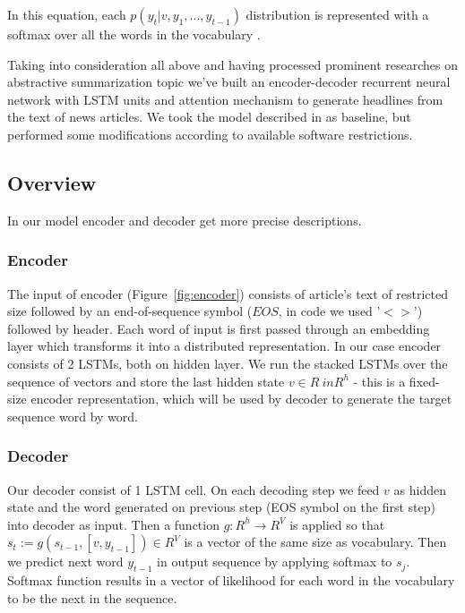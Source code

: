In this equation, each $p(y_t|v, y_1, ..., y_{t-1})$ distribution is represented with a softmax over all the
words in the vocabulary \cite{seq2seq_with_NN}.

Taking into consideration all above and having processed prominent researches on abstractive summarization topic we've built an encoder-decoder recurrent neural network with LSTM units and attention mechanism to generate headlines from the text of news articles. We took the model described in \cite{basic-article} as baseline, but performed some modifications according to available software restrictions.

\subsection{Overview}
In our model encoder and decoder get more precise descriptions. 

\subsubsection{Encoder}
The input of encoder (Figure~\ref{fig:encoder}) consists of article's text of restricted size followed by an end-of-sequence symbol ($EOS$, in code we used '$<>$') followed by header. Each word of input is first passed through an embedding layer which transforms it into a distributed representation.
In our case encoder consists of 2 LSTMs, both on hidden layer. We run the stacked LSTMs over the sequence of vectors and store the last hidden state $v \in R \ in R^h$ - this is a fixed-size encoder representation, which will be used by decoder to generate the target sequence word by word.   


\subsubsection{Decoder}
Our decoder consist of 1 LSTM cell. On each decoding step we feed $v$ as hidden state and the word generated on previous step (EOS symbol on the first step) into decoder as input.
Then a function $g: R^h \rightarrow R^V$ is applied so that $s_t := g(s_{t-1}, [v, y_{t-1}]) \in R^V$ is a vector of the same size as vocabulary. Then we predict next word $y_{t-1}$ in output sequence by applying softmax to $s_j$.  Softmax function results in a vector of likelihood for each word in the vocabulary to be the next in the sequence. 


